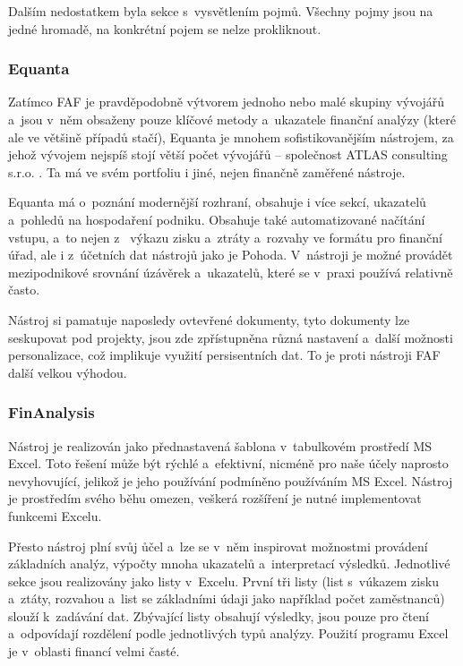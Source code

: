 Dalším nedostatkem byla sekce s~vysvětlením pojmů. Všechny pojmy jsou na jedné hromadě, na konkrétní pojem se nelze prokliknout.


\subsubsection{Equanta}
Zatímco FAF je pravděpodobně výtvorem jednoho nebo malé skupiny vývojářů a~jsou v~něm obsaženy pouze klíčové metody a~ukazatele finanční analýzy (které ale ve většině případů stačí), Equanta je mnohem sofistikovanějším nástrojem, za jehož vývojem nejspíš stojí větší počet vývojářů -- společnost ATLAS consulting s.r.o. . Ta má ve svém portfoliu i jiné, nejen finančně zaměřené nástroje.

Equanta má o~poznání modernější rozhraní, obsahuje i více sekcí, ukazatelů a~pohledů na hospodaření podniku. Obsahuje také automatizované načítání vstupu, a~to nejen z~ výkazu zisku a~ztráty a~rozvahy ve formátu pro finanční úřad, ale i z~účetních dat nástrojů jako je Pohoda. V~nástroji je možné provádět mezipodnikové srovnání úzávěrek a~ukazatelů, které se v~praxi používá relativně často.

Nástroj si pamatuje naposledy ovtevřené dokumenty, tyto dokumenty lze seskupovat pod projekty, jsou zde zpřístupněna různá nastavení a~další možnosti personalizace, což implikuje využití persisentních dat. To je proti nástroji FAF další velkou výhodou. 


\subsubsection{FinAnalysis}
Nástroj je realizován jako přednastavená šablona v~tabulkovém prostředí MS Excel. Toto řešení může být rýchlé a~efektivní, nicméně pro naše účely naprosto nevyhovující, jelikož je jeho používání podmíněno používáním MS Excel. Nástroj je prostředím svého běhu omezen, veškerá rozšíření je nutné implementovat funkcemi Excelu.

Přesto nástroj plní svůj ůčel a~lze se v~něm inspirovat možnostmi provádení základních analýz, výpočty mnoha ukazatelů a~interpretací výsledků. Jednotlivé sekce jsou realizovány jako listy v~Excelu. První tři listy (list s~vúkazem zisku a~ztáty, rozvahou a~list se základními údaji jako například počet zaměstnanců) slouží k~zadávání dat. Zbývající listy obsahují výsledky, jsou pouze pro čtení a~odpovídají rozdělení podle jednotlivých typů analýzy. Použití programu Excel je v~oblasti financí velmi časté.



